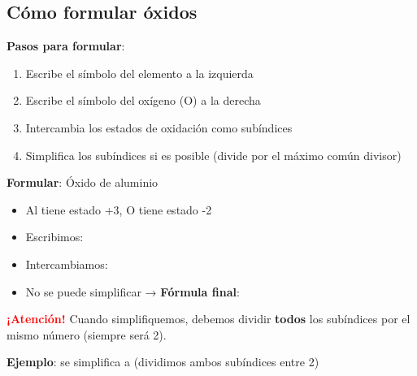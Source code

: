 \subsection{Cómo formular óxidos}

\textbf{Pasos para formular}:

\begin{enumerate}
    \item Escribe el símbolo del elemento a la izquierda
    \item Escribe el símbolo del oxígeno (O) a la derecha
    \item Intercambia los estados de oxidación como subíndices
    \item Simplifica los subíndices si es posible (divide por el máximo común divisor)
\end{enumerate}

\begin{example}
    \textbf{Formular}: Óxido de aluminio

    \begin{itemize}
        \item Al tiene estado +3, O tiene estado -2
        \item Escribimos:  
        \item Intercambiamos: 
        \item No se puede simplificar → \textbf{Fórmula final}: 
    \end{itemize}
\end{example}


\begin{remark}
    \textbf{\textcolor{red}{¡Atención!}} Cuando simplifiquemos, debemos dividir \textbf{todos} los subíndices por el mismo número (siempre será 2).

    \textbf{Ejemplo}:  se simplifica a  (dividimos ambos subíndices entre 2)
\end{remark}

%



